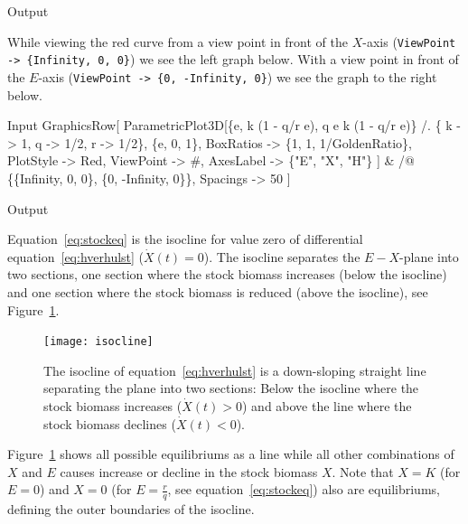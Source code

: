 \documentclass[11pt,fleqn]{book} %
\begin{document}
\begin{theorem}
\begin{mmaCell}[moregraphics={moreig={scale=.6}}]{Output}
\end{mmaCell}
While viewing the red curve from a view point in front of the $X$-axis (\texttt{ViewPoint -> \{Infinity, 0, 0\}}) we see the left graph below. With a view point in front of the $E$-axis (\texttt{ViewPoint -> \{0, -Infinity, 0\}}) we see the graph to the right below.
\begin{mmaCell}{Input}
  GraphicsRow[
    ParametricPlot3D[\{e, k (1 - q/r e), q e k (1 - q/r e)\} /. \{
      k -> 1, q -> 1/2, r -> 1/2\},
      \{e, 0, 1\}, 
      BoxRatios -> \{1, 1, 1/GoldenRatio\}, 
      PlotStyle -> Red,
      ViewPoint -> #, 
      AxesLabel -> \{"E", "X", "H"\}
    ] & /@ \{\{Infinity, 0, 0\}, \{0, -Infinity, 0\}\},  
    Spacings -> 50
  ]
\end{mmaCell}
\begin{mmaCell}[moregraphics={moreig={scale=.8}}]{Output}
\end{mmaCell}
\label{code:equilibrium}
\end{theorem}

Equation~\ref{eq:stockeq} is the isocline for value zero of differential equation~\ref{eq:hverhulst} ($\dot{X}(t) = 0$). The isocline separates the $E-X$-plane into two sections, one section where the stock biomass increases (below the isocline) and one section where the stock biomass is reduced (above the isocline), see Figure~\ref{fig:isocline}.
\hfill \break
\begin{figure}[ht]
\centering
\texttt{[image: isocline]}
\caption{The isocline of equation~\ref{eq:hverhulst} is a down-sloping straight line separating the plane into two sections: Below the isocline where the stock biomass increases ($\dot{X}(t) > 0$) and above the line where the stock biomass declines ($\dot{X}(t) < 0$).}
\label{fig:isocline}
\end{figure}
\hfill \break
Figure~\ref{fig:isocline} shows all possible equilibriums as a line while all other combinations of $X$ and $E$ causes increase or decline in the stock biomass $X$. Note that $X = K$ (for $E =0$) and $X = 0$ (for $E =\frac{r}{q}$, see equation~\ref{eq:stockeq}) also are equilibriums, defining the outer boundaries of the isocline.
\end{document}
